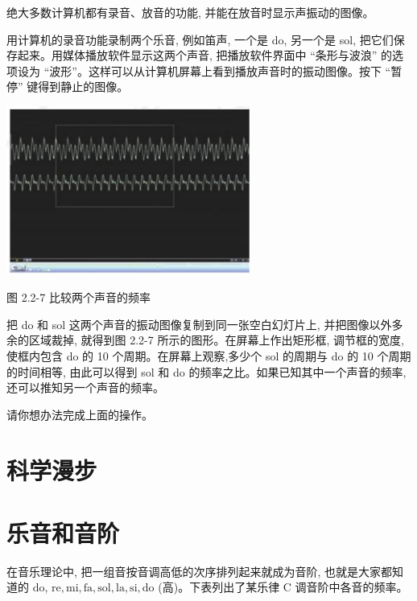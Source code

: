 \documentclass[10pt]{article}
\begin{document}
绝大多数计算机都有录音、放音的功能, 并能在放音时显示声振动的图像。

用计算机的录音功能录制两个乐音, 例如笛声, 一个是 do, 另一个是 sol, 把它们保存起来。用媒体播放软件显示这两个声音, 把播放软件界面中 “条形与波浪” 的选项设为 “波形”。这样可以从计算机屏幕上看到播放声音时的振动图像。按下 “暂停” 键得到静止的图像。

\begin{center}
\includegraphics[max width=0.6\textwidth]{images/01910e4c-ebb8-7d2c-8f2f-2375bc1d2d12_45_729818.jpg}
\end{center}

图 2.2-7 比较两个声音的频率

把 do 和 sol 这两个声音的振动图像复制到同一张空白幻灯片上, 并把图像以外多余的区域裁掉, 就得到图 2.2-7 所示的图形。在屏幕上作出矩形框, 调节框的宽度, 使框内包含 do 的 10 个周期。在屏幕上观察,多少个 sol 的周期与 do 的 10 个周期的时间相等, 由此可以得到 sol 和 do 的频率之比。如果已知其中一个声音的频率, 还可以推知另一个声音的频率。

请你想办法完成上面的操作。

\section*{科学漫步}

\section*{乐音和音阶}

在音乐理论中, 把一组音按音调高低的次序排列起来就成为音阶, 也就是大家都知道的 do, \(\mathrm{{re}},\mathrm{{mi}},\mathrm{{fa}},\mathrm{{sol}},\mathrm{{la}},\mathrm{{si}},\mathrm{{do}}\) (高)。下表列出了某乐律 \(\mathrm{C}\) 调音阶中各音的频率。

\begin{center}
\end{center}
\end{document}
